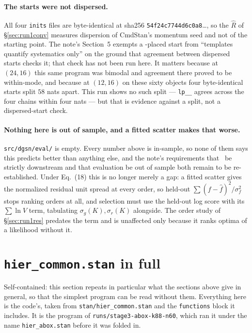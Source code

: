 \documentclass[11pt]{article}
\newcommand{\file}[1]{\texttt{#1}}
\newcommand{\code}[1]{\texttt{#1}}
\begin{document}
\paragraph{The starts were not dispersed.} All four \code{inits} files are byte-identical
at sha256 \code{54f24c7744d6c0a8}\ldots, so the $\hat R$ of \S\ref{sec:run1conv} measures
dispersion of CmdStan's momentum seed and not of the starting point. The note's Section~5
exempts a \salt-placed start from ``templates quantify systematics only'' on the ground
that agreement between dispersed starts checks it; that check has not been run here. It
matters because at $(24,16)$ this same program was bimodal and agreement there proved to be
within-mode, and because at $(12,16)$ on these sixty objects four byte-identical starts
split $58$ nats apart. This run shows no such split --- \code{lp\_\_} agrees across the four chains
within four nats --- but that is evidence against a split, not a dispersed-start check.

\paragraph{Nothing here is out of sample, and a fitted scatter makes that worse.}
\file{src/dgsn/eval/} is empty. Every number above is in-sample, so none of them says this
predicts better than anything else, and the note's requirements that \salt\ be strictly
downstream and that evaluation be out of sample both remain to be re-established. Under
Eq.~(18) this is no longer merely a gap: a fitted scatter gives the normalized
residual unit spread at every order, so held-out $\sum (f - \hat f)^{2}/\sigma_{f}^{2}$
stops ranking orders at all, and selection must use the held-out log score with its
$\sum \ln V$ term, tabulating $\sigma_{g}(K), \sigma_{r}(K)$ alongside. The order study of
\S\ref{sec:run1res} predates the term and is unaffected only because it ranks optima of a
likelihood without it.

\section{\file{hier\_common.stan} in full}
\label{sec:common}

Self-contained: this section repeats in particular what the sections above give in general,
so that the simplest program can be read without them. Everything here is the code's, taken
from \file{stan/hier\_common.stan} and the \code{functions} block it includes. It is the
program of \file{runs/stage3-abox-k88-n60}, which ran it under the name
\file{hier\_abox.stan} before it was folded in.
\end{document}
